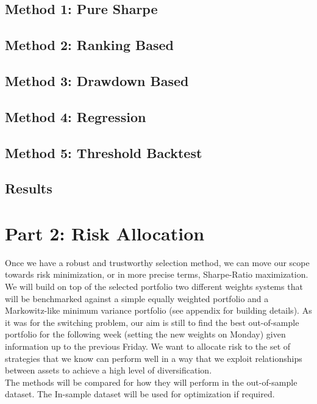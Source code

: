 \documentclass[12pt]{article} %
\numberwithin{equation}{subsection}
\begin{document}
\subsection{Method 1: Pure Sharpe}




\subsection{Method 2: Ranking Based}




\subsection{Method 3: Drawdown Based}



\subsection{Method 4: Regression}



\subsection{Method 5: Threshold Backtest}



\subsection{Results}



\newpage

\section{Part 2: Risk Allocation}

Once we have a robust and trustworthy selection method, we can move our scope towards risk minimization, or in more precise terms, Sharpe-Ratio maximization. We will build on top of the selected portfolio two different weights systems that will be benchmarked against a simple equally weighted portfolio and a Markowitz-like minimum variance portfolio (see appendix for building details). As it was for the switching problem, our aim is still to find the best out-of-sample portfolio for the following week (setting the new weights on Monday) given information up to the previous Friday. We want to allocate risk to the set of strategies that we know can perform well in a way that we exploit relationships between assets to achieve a high level of diversification.\\
The methods will be compared for how they will perform in the out-of-sample dataset. The In-sample dataset will be used for optimization if required.\\ 
\end{document}
